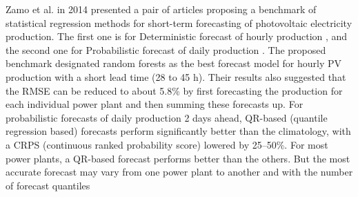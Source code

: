 Zamo et al. in 2014 presented a pair of articles proposing a benchmark of statistical regression methods for short-term forecasting of photovoltaic electricity production.
The first one is for Deterministic forecast of hourly production \cite{ZAMO2014792}, and the second one for Probabilistic forecast of daily production \cite{ZAMO2014804}.
The proposed benchmark designated random forests as the best forecast model for hourly PV production with a short lead time (28 to 45 h).
Their results also suggested that the RMSE can be reduced to about 5.8\% by first forecasting the production for each individual power plant and then summing these forecasts up.
For probabilistic forecasts of daily production 2 days ahead, QR-based (quantile regression based) forecasts perform significantly better than the climatology, with a CRPS (continuous ranked probability score) lowered by 25–50\%.
For most power plants, a QR-based forecast performs better than the others.
But the most accurate forecast may vary from one power plant to another and with the number of forecast quantiles

